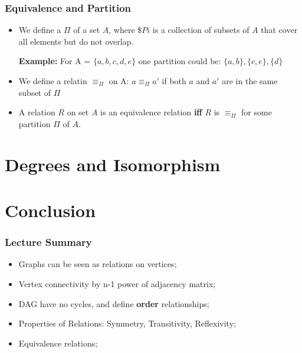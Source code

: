 \documentclass{beamer}
\begin{document}
\begin{frame}
  \frametitle{Equivalence and Partition}

  {\larger
    \begin{itemize}
    \item We define a  $\Pi$ of a set $A$, where
      $\$Pi$ is a collection of subsets of $A$ that cover all elements
      but do not overlap.

      \bigskip

      {\bf Example:} For A = $\{a,b,c,d,e\}$ one partition could be:
      $\{a,b\},\{c,e\},\{d\}$


      \bigskip

    \item We define a relatin $\equiv_{\Pi}$ on A: $a \equiv_{\Pi} a'$
      if both $a$ and $a'$ are in the same subset of $\Pi$

      \bigskip

    \item A relation $R$ on set $A$ is an equivalence relation {\bf
      iff} $R$ is $\equiv_{\Pi}$ for some partition $\Pi$ of $A$.
    \end{itemize}

  }
\end{frame}


\section{Degrees and Isomorphism}

\section{Conclusion}
\begin{frame}
  \frametitle{Lecture Summary}

  {\larger
  \begin{itemize}
  \item Graphs can be seen as relations on vertices;
  \item Vertex connectivity by n-1 power of adjacency matrix;
  \item DAG have no cycles, and define {\bf order} relationships;
  \item Properties of Relations: Symmetry, Transitivity, Reflexivity;
  \item Equivalence relations;
  \end{itemize}
  }
\end{frame}
\end{document}
